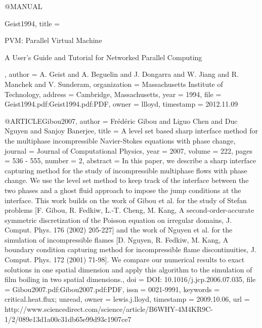 {@MANUAL{Geist1994,
  title = {{PVM}: Parallel Virtual Machine
	
	A User's Guide and Tutorial for Networked Parallel Computing},
  author = {A. Geist and A. Beguelin and J. Dongarra and W. Jiang and R. Manchek
	and V. Sunderam},
  organization = {Massachusetts Institute of Technology},
  address = {Cambridge, Massachusetts},
  year = {1994},
  file = {Geist1994.pdf:Geist1994.pdf:PDF},
  owner = {llloyd},
  timestamp = {2012.11.09}
}

@ARTICLE{Gibou2007,
  author = {Frédéric Gibou and Liguo Chen and Duc Nguyen and Sanjoy Banerjee},
  title = {A level set based sharp interface method for the multiphase incompressible
	Navier-Stokes equations with phase change},
  journal = {Journal of Computational Physics},
  year = {2007},
  volume = {222},
  pages = {536 - 555},
  number = {2},
  abstract = {In this paper, we describe a sharp interface capturing method for
	the study of incompressible multiphase flows with phase change. We
	use the level set method to keep track of the interface between the
	two phases and a ghost fluid approach to impose the jump conditions
	at the interface. This work builds on the work of Gibou et al. for
	the study of Stefan problems [F. Gibou, R. Fedkiw, L.-T. Cheng, M.
	Kang, A second-order-accurate symmetric discretization of the Poisson
	equation on irregular domains, J. Comput. Phys. 176 (2002) 205-227]
	and the work of Nguyen et al. for the simulation of incompressible
	flames [D. Nguyen, R. Fedkiw, M. Kang, A boundary condition capturing
	method for incompressible flame discontinuities, J. Comput. Phys.
	172 (2001) 71-98]. We compare our numerical results to exact solutions
	in one spatial dimension and apply this algorithm to the simulation
	of film boiling in two spatial dimensions.},
  doi = {DOI: 10.1016/j.jcp.2006.07.035},
  file = {Gibou2007.pdf:Gibou2007.pdf:PDF},
  issn = {0021-9991},
  keywords = {critical.heat.flux; unread},
  owner = {lewis.j.lloyd},
  timestamp = {2009.10.06},
  url = {http://www.sciencedirect.com/science/article/B6WHY-4M4KR9C-1/2/089e13d1a00c31db65e99d93c1907ce7}
}

}
